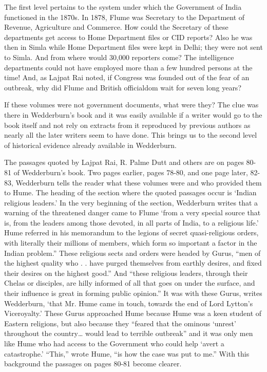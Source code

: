 \begin{multicols}{2}
The first level pertains to the system under which the Government of India functioned in the 1870s. In 1878, Flume was Secretary to the Department of Revenue, Agriculture and Commerce. How could the Secretary of these departments get access to Home Department files or CID reports? Also he was then in Simla while Home Department files were kept in Delhi; they were not sent to Simla. And from where would 30,000 reporters come? The intelligence departments could not have employed more than a few hundred persons at the time! And, as Lajpat Rai noted, if Congress was founded out of the fear of an outbreak, why did Flume and British officialdom wait for seven long years?

If these volumes were not government documents, what were they? The clue was there in Wedderburn's book and it was easily available if a writer would go to the book itself and not rely on extracts from it reproduced by previous authors as nearly all the later writers seem to have done. This brings us to the second level of historical evidence already available in Wedderburn.

The passages quoted by Lajpat Rai, R. Palme Dutt and others are on pages 80-81 of Wedderburn's book. Two pages earlier, pages 78-80, and one page later, 82-83, Wedderburn tells the reader what these volumes were and who provided them to Hume. The heading of the section where the quoted passages occur is `Indian religious leaders.' In the very beginning of the section, Wedderburn writes that a warning of the threatened danger came to Flume `from a very special source that is, from the leaders among those devoted, in all parts of India, to a religious life.' Hume referred in his memorandum to the legions of secret quasi-religious orders, with literally their millions of members, which form so important a factor in the Indian problem.'' These religious sects and orders were headed by Gurus, ``men of the highest quality who . . have purged themselves from earthly desires, and fixed their desires on the highest good.'' And ``these religious leaders, through their Chelas or disciples, are hilly informed of all that goes on under the surface, and their influence is great in forming public opinion.'' It was with these Gurus, writes Wedderburn, `that Mr. Hume came in touch, towards the end of Lord Lytton's Viceroyalty.' These Gurus approached Hume because Hume was a keen student of Eastern religions, but also because they ``feared that the ominous `unrest' throughout the country… would lead to terrible outbreak'' and it was only men like Hume who had access to the Government who could help `avert a catastrophe.' ``This,'' wrote Hume, ``is how the case was put to me.'' With this background the passages on pages 80-81 become clearer.


\end{multicols}
